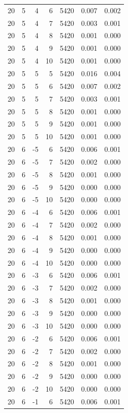 \begin{table}
\begin{tabular}{rrrrrrr}
20 & 5 & 4 & 6 & 5420 & 0.007 & 0.002 \\
20 & 5 & 4 & 7 & 5420 & 0.003 & 0.001 \\
20 & 5 & 4 & 8 & 5420 & 0.001 & 0.000 \\
20 & 5 & 4 & 9 & 5420 & 0.001 & 0.000 \\
20 & 5 & 4 & 10 & 5420 & 0.001 & 0.000 \\
20 & 5 & 5 & 5 & 5420 & 0.016 & 0.004 \\
20 & 5 & 5 & 6 & 5420 & 0.007 & 0.002 \\
20 & 5 & 5 & 7 & 5420 & 0.003 & 0.001 \\
20 & 5 & 5 & 8 & 5420 & 0.001 & 0.000 \\
20 & 5 & 5 & 9 & 5420 & 0.001 & 0.000 \\
20 & 5 & 5 & 10 & 5420 & 0.001 & 0.000 \\
20 & 6 & -5 & 6 & 5420 & 0.006 & 0.001 \\
20 & 6 & -5 & 7 & 5420 & 0.002 & 0.000 \\
20 & 6 & -5 & 8 & 5420 & 0.001 & 0.000 \\
20 & 6 & -5 & 9 & 5420 & 0.000 & 0.000 \\
20 & 6 & -5 & 10 & 5420 & 0.000 & 0.000 \\
20 & 6 & -4 & 6 & 5420 & 0.006 & 0.001 \\
20 & 6 & -4 & 7 & 5420 & 0.002 & 0.000 \\
20 & 6 & -4 & 8 & 5420 & 0.001 & 0.000 \\
20 & 6 & -4 & 9 & 5420 & 0.000 & 0.000 \\
20 & 6 & -4 & 10 & 5420 & 0.000 & 0.000 \\
20 & 6 & -3 & 6 & 5420 & 0.006 & 0.001 \\
20 & 6 & -3 & 7 & 5420 & 0.002 & 0.000 \\
20 & 6 & -3 & 8 & 5420 & 0.001 & 0.000 \\
20 & 6 & -3 & 9 & 5420 & 0.000 & 0.000 \\
20 & 6 & -3 & 10 & 5420 & 0.000 & 0.000 \\
20 & 6 & -2 & 6 & 5420 & 0.006 & 0.001 \\
20 & 6 & -2 & 7 & 5420 & 0.002 & 0.000 \\
20 & 6 & -2 & 8 & 5420 & 0.001 & 0.000 \\
20 & 6 & -2 & 9 & 5420 & 0.000 & 0.000 \\
20 & 6 & -2 & 10 & 5420 & 0.000 & 0.000 \\
20 & 6 & -1 & 6 & 5420 & 0.006 & 0.001 \\

\end{tabular}
\end{table}
